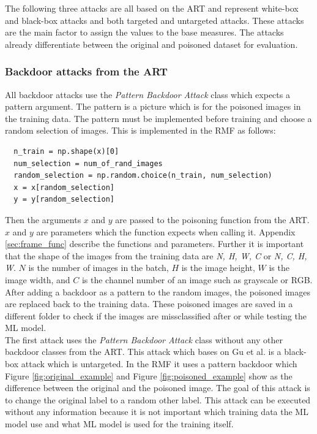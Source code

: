 The following three attacks are all based on the ART \cite{art2018} and represent white-box and black-box attacks and both targeted and untargeted attacks. These attacks are the main factor to assign the values to the base measures. The attacks already differentiate between the original and poisoned dataset for evaluation.

\subsubsection*{Backdoor attacks from the ART}
\label{sec:backdoors_art}

All backdoor attacks use the \textit{Pattern Backdoor Attack} \cite{DBLP:journals/corr/abs-1708-06733} class which expects a pattern argument. The pattern is a picture which is for the poisoned images in the training data. The pattern must be implemented before training and choose a random selection of images. This is implemented in the RMF as follows:

\begin{lstlisting}
  n_train = np.shape(x)[0]
  num_selection = num_of_rand_images
  random_selection = np.random.choice(n_train, num_selection)
  x = x[random_selection]
  y = y[random_selection]
\end{lstlisting}

Then the arguments $x$ and $y$ are passed to the poisoning function from the ART. $x$ and $y$ are parameters which the function expects when calling it. Appendix \ref{sec:frame_func} describe the functions and parameters. Further it is important that the shape of the images from the training data are \textit{N, H, W, C} or \textit{N, C, H, W}. $N$ is the number of images in the batch, $H$ is the image height, $W$ is the image width, and $C$ is the channel number of an image such as grayscale or RGB. After adding a backdoor as a pattern to the random images, the poisoned images are replaced back to the training data. These poisoned images are saved in a different folder to check if the images are missclassified after or while testing the ML model.\\

The first attack uses the \textit{Pattern Backdoor Attack} class without any other backdoor classes from the ART. This attack which bases on Gu et al. \cite{DBLP:journals/corr/abs-1708-06733} is a black-box attack which is untargeted. In the RMF it uses a pattern backdoor which Figure \ref{fig:original_example} and Figure \ref{fig:poisoned_example} show as the difference between the original and the poisoned image. The goal of this attack is to change the original label to a random other label. This attack can be executed without any information because it is not important which training data the ML model use and what ML model is used for the training itself.

